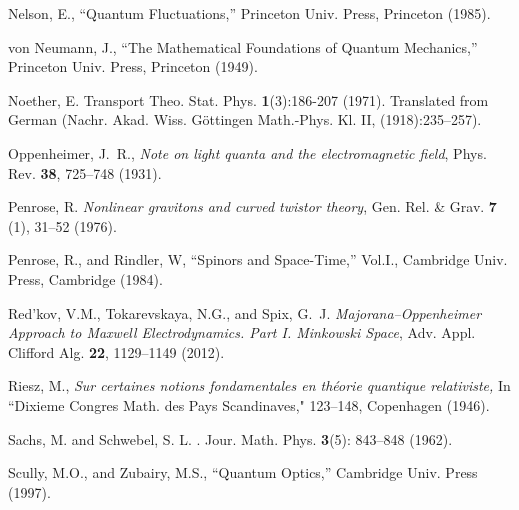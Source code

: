 \documentclass[11pt]{article}
\theoremstyle{definition}
\numberwithin{equation}{section}
\begin{document}
\begin{thebibliography}{[KTZ2020]}
        Nelson, E.,
                ``{Quantum Fluctuations},''
        Princeton Univ. Press, Princeton (1985).\vspace{-4pt}

        von Neumann, J.,
                ``{The Mathematical Foundations of Quantum Mechanics},''
        Princeton Univ. Press, Princeton (1949).\vspace{-4pt}

Noether, E. 
\newblock Transport Theo. Stat. Phys. {\bf 1}(3):186-207 (1971).
\newblock Translated from German  (Nachr. Akad. Wiss. G\"ottingen Math.-Phys. Kl. II, (1918):235--257).\vspace{-4pt}


	Oppenheimer, J.~R.,
	\textit{Note on light quanta and the electromagnetic field},
	Phys. Rev. \textbf{38}, 725--748 (1931).\vspace{-4pt}

Penrose, R.
\textit{Nonlinear gravitons and curved twistor theory},
Gen. Rel. \& Grav. \textbf{7} (1), 31--52 (1976).

  Penrose, R.,
  and
  Rindler, W,
  ``Spinors and Space-Time,'' Vol.I., Cambridge Univ. Press, Cambridge (1984).\vspace{-4pt}
   
  Red'kov, V.M.,
  Tokarevskaya, N.G.,
  and 
  Spix, G.~J. 
   \textit{Majorana--Oppenheimer Approach to Maxwell Electrodynamics. Part I. Minkowski Space},
   Adv. Appl. Clifford Alg. \textbf{22}, 1129--1149 (2012).\vspace{-4pt}

Riesz, M., 
{\it Sur certaines notions fondamentales en th\'eorie quantique relativiste,}
 In ``Dixieme Congres Math. des Pays Scandinaves," 123--148, Copenhagen (1946).%

Sachs, M. and Schwebel, S. L.
.
\newblock Jour. Math. Phys. {\bf 3}(5): 843--848 (1962).\vspace{-4pt}

  Scully, M.O.,
  and 
  Zubairy, M.S., 
  ``Quantum Optics,'' Cambridge Univ. Press (1997). \vspace{-4pt}


\end{thebibliography}
\end{document}
